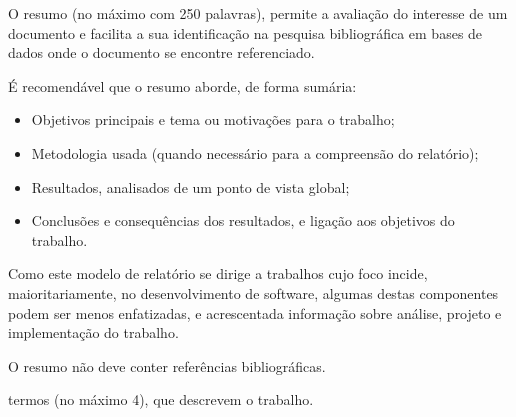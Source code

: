 
O resumo (no máximo com 250 palavras), permite a avaliação do interesse de um documento e facilita a sua identificação na pesquisa bibliográfica em bases de dados onde o documento se encontre referenciado. 

É recomendável que o resumo aborde, de forma sumária:
\begin{itemize}
	\item Objetivos principais e tema ou motivações para o trabalho; 
	\item Metodologia usada (quando necessário para a compreensão do relatório); 
	\item Resultados, analisados de um ponto de vista global; 
	\item Conclusões e consequências dos resultados, e ligação aos objetivos do trabalho.
\end{itemize}

Como este modelo de relatório se dirige a trabalhos cujo foco incide, maioritariamente, no desenvolvimento de software, algumas destas componentes podem ser menos enfatizadas, e acrescentada informação sobre análise, projeto e implementação do trabalho.

O resumo não deve conter referências bibliográficas.

\mbox{}\linebreak
{} termos (no máximo 4), que descrevem o trabalho.


